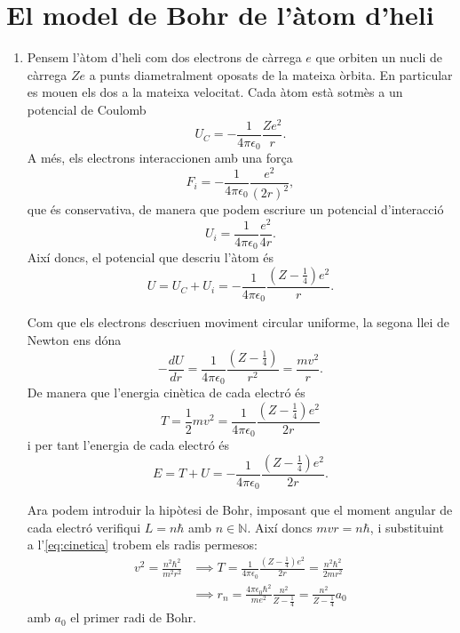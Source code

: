\documentclass[12pt]{article}
\numberwithin{table}{section}
\numberwithin{figure}{section}
\numberwithin{equation}{section}
\newcommand{\N}{\mathbb{N}}
\begin{document}
\section{El model de Bohr de l'àtom d'heli}
\begin{enumerate}[label=(\alph*), font=\bfseries \sffamily, wide, labelwidth=!, labelindent=0pt]
	\item Pensem l'àtom d'heli com dos electrons de càrrega \( e \) que orbiten un nucli de càrrega \( Ze \) a punts diametralment oposats de la mateixa òrbita. En particular es mouen els dos a la mateixa velocitat. Cada àtom està sotmès a un potencial de Coulomb 
		\begin{equation*}
			U_C = -\frac{1}{4\pi\epsilon_0}\frac{Ze^2}{r}.
		\end{equation*}
		A més, els electrons interaccionen amb una força
		\begin{equation*}
			F_i = -\frac{1}{4\pi\epsilon_0} \frac{e^2}{(2r)^2},
		\end{equation*}
		que és conservativa, de manera que podem escriure un potencial d'interacció
		\begin{equation*}
			U_i = \frac{1}{4\pi\epsilon_0}\frac{e^2}{4r}.
		\end{equation*}
		Així doncs, el potencial que descriu l'àtom és
		\begin{equation*}
			U = U_C + U_i = -\frac{1}{4\pi\epsilon_0} \frac{(Z - \tfrac{1}{4})e^2}{r}.
		\end{equation*}

		Com que els electrons descriuen moviment circular uniforme, la segona llei de Newton ens dóna
		\begin{equation*}
			-\frac{dU}{dr} = \frac{1}{4\pi\epsilon_0}\frac{(Z - \frac{1}{4})}{r^2} = \frac{mv^2}{r}.
		\end{equation*}
		De manera que l'energia cinètica de cada electró és
		\begin{equation}\label{eq:cinetica}
			T = \frac{1}{2}mv^2 = \frac{1}{4\pi\epsilon_0}\frac{(Z - \frac{1}{4})e^2}{2r}
		\end{equation}
		i per tant l'energia de cada electró és
		\begin{equation} \label{eq:energia total}
			E = T + U = -\frac{1}{4\pi\epsilon_0}\frac{(Z - \frac{1}{4})e^2}{2r}.
		\end{equation}

		Ara podem introduir la hipòtesi de Bohr, imposant que el moment angular de cada electró verifiqui \( L = n\hbar \) amb \( n \in \N \). Així doncs \( mvr = n\hbar \), i substituint a l'\cref{eq:cinetica} trobem els radis permesos:
		\begin{align*}
			v^2 = \frac{n^2 \hbar^2}{m^2r^2} &\implies T = \frac{1}{4\pi\epsilon_0}\frac{(Z - \frac{1}{4})e^2}{2r} = \frac{n^2\hbar^2}{2mr^2} \\
																	 		 &\implies r_n = \frac{4\pi\epsilon_0\hbar^2}{me^2}\frac{n^2}{Z - \frac{1}{4}} = \frac{n^2}{Z - \frac{1}{4}}a_0
		\end{align*}
		amb \( a_0 \) el primer radi de Bohr. 


\end{enumerate}
\end{document}
